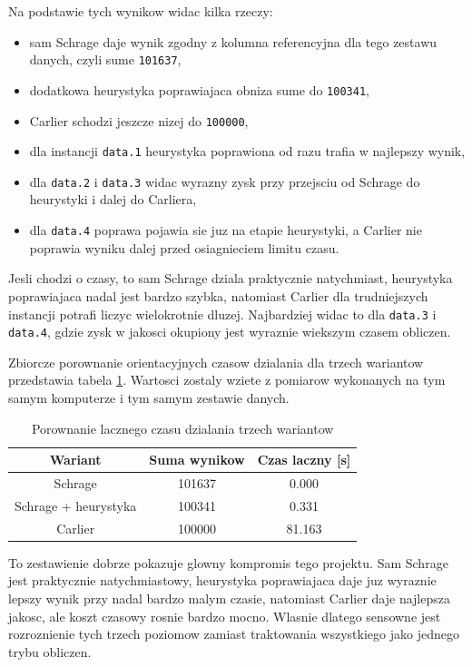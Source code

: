 \documentclass[12pt,a4paper]{article}
\begin{document}
Na podstawie tych wynikow widac kilka rzeczy:

\begin{itemize}
    \item sam Schrage daje wynik zgodny z kolumna referencyjna dla tego zestawu danych, czyli sume \texttt{101637},
    \item dodatkowa heurystyka poprawiajaca obniza sume do \texttt{100341},
    \item Carlier schodzi jeszcze nizej do \texttt{100000},
    \item dla instancji \texttt{data.1} heurystyka poprawiona od razu trafia w najlepszy wynik,
    \item dla \texttt{data.2} i \texttt{data.3} widac wyrazny zysk przy przejsciu od Schrage do heurystyki i dalej do Carliera,
    \item dla \texttt{data.4} poprawa pojawia sie juz na etapie heurystyki, a Carlier nie poprawia wyniku dalej przed osiagnieciem limitu czasu.
\end{itemize}

Jesli chodzi o czasy, to sam Schrage dziala praktycznie natychmiast, heurystyka poprawiajaca nadal jest bardzo szybka, natomiast Carlier dla trudniejszych instancji potrafi liczyc wielokrotnie dluzej. Najbardziej widac to dla \texttt{data.3} i \texttt{data.4}, gdzie zysk w jakosci okupiony jest wyraznie wiekszym czasem obliczen.

Zbiorcze porownanie orientacyjnych czasow dzialania dla trzech wariantow przedstawia tabela \ref{tab:czasy3}. Wartosci zostaly wziete z pomiarow wykonanych na tym samym komputerze i tym samym zestawie danych.

\begin{table}[h]
\centering
\begin{tabular}{ccc}
\toprule
Wariant & Suma wynikow & Czas laczny [s] \\
\midrule
Schrage & 101637 & 0.000 \\
Schrage + heurystyka & 100341 & 0.331 \\
Carlier & 100000 & 81.163 \\
\bottomrule
\end{tabular}
\caption{Porownanie lacznego czasu dzialania trzech wariantow}
\label{tab:czasy3}
\end{table}

To zestawienie dobrze pokazuje glowny kompromis tego projektu. Sam Schrage jest praktycznie natychmiastowy, heurystyka poprawiajaca daje juz wyraznie lepszy wynik przy nadal bardzo malym czasie, natomiast Carlier daje najlepsza jakosc, ale koszt czasowy rosnie bardzo mocno. Wlasnie dlatego sensowne jest rozroznienie tych trzech poziomow zamiast traktowania wszystkiego jako jednego trybu obliczen.
\end{document}
